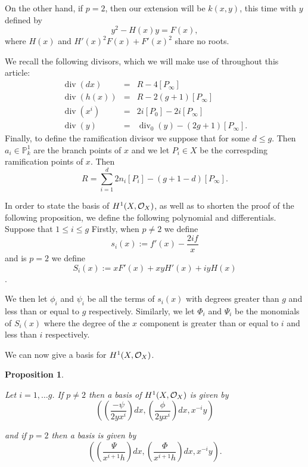 \documentclass[draft, 11pt]{article} %
\theoremstyle{plain}
\newtheorem{prop}[defn]{Proposition}
\theoremstyle{remark}
\newcommand{\cO}{{\cal O}}
\DeclareMathOperator{\di}{div}
\begin{document}
On the other hand, if $p=2$, then our extension will be $k(x,y)$, this time with $y$ defined by
\[
	y^2 - H(x)y = F(x),
\]
where $H(x)$ and $H'(x)^2F(x) + F'(x)^2$ share no roots.

We recall the following divisors, which we will make use of throughout this article:
\begin{eqnarray*}
\di (dx) & = & R - 4[P_\infty] \\
\di (h(x)) & = & R - 2(g+1)[P_\infty] \\
\di (x^i) & = & 2i[P_0] - 2i[P_\infty]\\
\di (y) & = & \di_0(y) - (2g+1)[P_\infty].
\end{eqnarray*}
Finally, to define the ramification divisor we suppose that  for some $d \leq g$.
Then $a_i \in \mathbb P_k^1$ are the branch points of $x$ and we let $P_i \in X$ be the correspding ramification points of $x$.
Then 
\[
R = \sum_{i=1}^d 2n_i[P_i] - (g+1-d)[P_\infty].
\]


In order to state the basis of $H^1(X,\cO_X)$, as well as to shorten the proof of the following proposition, we define the following polynomial and differentials.
Suppose that $1 \leq i \leq g$
Firstly, when $p\neq 2$ we define 
\[
	s_i(x) := f'(x) - \frac{2if}{x}
\]
and is $p = 2$ we define
\[
	S_i(x) := xF'(x) + xyH'(x) + iyH(x)
\].

We then let $\phi_i$ and $\psi_i$ be all the terms of $s_i(x)$ with degrees greater than $g$ and less than or equal to $g$ respectively.
Similarly, we let $\Phi_i$ and $\Psi_i$ be the monomials of $S_i(x)$ where the degree of the $x$ component is greater than or equal to $i$ and less than $i$ respectively.

We can now give a basis for $H^1(X,\cO_X)$.

\begin{prop}\label{basis}

Let $i=1,\ldots g$. If $p\neq 2$ then a basis of $H^1(X,\cO_X)$ is given by 
\[
	\left( \left( \frac{-\psi}{2yx^i}\right) dx, \left(\frac{\phi}{2yx^i}\right) dx, x^{-i}y\right)
\]

and if $p=2$ then a basis is given by
\[
	\left( \left(\frac{\Psi}{x^{i+1}h}\right) dx, \left( \frac{\Phi}{x^{i+1}h} \right) dx, x^{-i}y \right).
\]
\end{prop}

\begin{comment}
We define $\alpha^i_j$ and $\Alpha^i_{j+1}$ for $0 \leq j \leq 2g$, and $\Beta_k^i$ for $1\leq k \leq g$, such that
\[
	$s_i(x) = \alpha^i_{2g}x^{2g} + \ldots + \alpha^i_0 \ {\rm and } \ S_i(x) = \alpha_{2g+1}^ix^{2g+1} + \ldots + \alpha^i_1 x + y(\Beta_g^i x^i + \ldots + \Beta_1^i x).
\] 
\end{comment}


	
\end{document}
